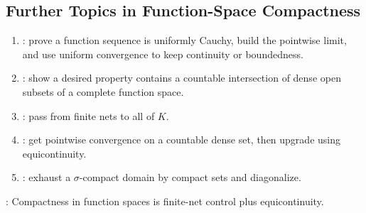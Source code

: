 \subsection{Further Topics in Function-Space Compactness}

\begin{method} \label{meth:function-space-compactness-proof-patterns} 
\begin{enumerate}[label=(\roman*)]
\setlength{\itemsep}{0pt}
\item {}: prove a function sequence is uniformly Cauchy, build the pointwise limit, and use uniform convergence to keep continuity or boundedness.
\item {}: show a desired property contains a countable intersection of dense open subsets of a complete function space.
\item {}: pass from finite nets to all of $K$.
\item {}: get pointwise convergence on a countable dense set, then upgrade using equicontinuity.
\item {}: exhaust a $\sigma$-compact domain by compact sets and diagonalize.
\end{enumerate}
: Compactness in function spaces is finite-net control plus equicontinuity.
\end{method}
